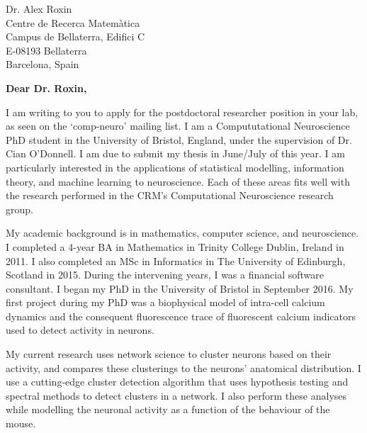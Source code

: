 \documentclass[11pt]{letter} %
\begin{document}

\begin{letter}{Dr. Alex Roxin \\ 
  Centre de Recerca Matem\`{a}tica \\ 
  Campus de Bellaterra, Edifici C \\
  E-08193 Bellaterra \\
  Barcelona, Spain} %


  \opening{\textbf{Dear Dr. Roxin,}}
  
  I am writing to you to apply for the postdoctoral researcher position in your lab, as seen on the `comp-neuro' mailing list. I am a Compututational Neuroscience PhD student in the University of Bristol, England, under the supervision of Dr. Cian O'Donnell. I am due to submit my thesis in June/July of this year. I am particularly interested in the applications of statistical modelling, information theory, and machine learning to neuroscience. Each of these areas fits well with the research performed in the CRM's Computational Neuroscience research group.

  My academic background is in mathematics, computer science, and neuroscience. I completed a 4-year BA in Mathematics in Trinity College Dublin, Ireland in 2011. I also completed an MSc in Informatics in The University of Edinburgh, Scotland in 2015. During the intervening years, I was a financial software consultant. I began my PhD in the University of Bristol in September 2016. My first project during my PhD was a biophysical model of intra-cell calcium dynamics and the consequent fluorescence trace of fluorescent calcium indicators used to detect activity in neurons. 

  My current research uses network science to cluster neurons based on their activity, and compares these clusterings to the neurons' anatomical distribution. I use a cutting-edge cluster detection algorithm that uses hypothesis testing and spectral methods to detect clusters in a network. I also perform these analyses while modelling the neuronal activity as a function of the behaviour of the mouse.


\end{letter}
\end{document}
